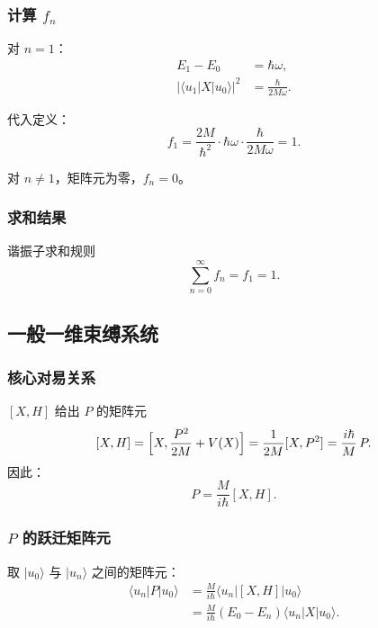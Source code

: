 \subsubsection{计算 $f_n$}

对 $n=1$：
\begin{align*}
  E_1 - E_0 &= \hbar\omega, \\
  \bigl|\langle u_1|X|u_0\rangle\bigr|^2 &= \frac{\hbar}{2M\omega}.
\end{align*}

代入定义：
\[
  f_1 = \frac{2M}{\hbar^2} \cdot \hbar\omega \cdot \frac{\hbar}{2M\omega} = \boxed{1}.
\]

对 $n\neq 1$，矩阵元为零，$f_n = 0$。

\subsubsection{求和结果}

\begin{formulabox}{谐振子求和规则}
\[
  \sum_{n=0}^{\infty} f_n = f_1 = \boxed{1}.
\]
\end{formulabox}


\subsection{一般一维束缚系统}

\subsubsection{核心对易关系}

\begin{tipbox}{$[X,H]$ 给出 $P$ 的矩阵元}
\[
  [X,H] = \Bigl[X, \frac{P^2}{2M} + V(X)\Bigr]
       = \frac{1}{2M}[X,P^2]
       = \frac{i\hbar}{M}\,P.
\]
因此：
\[
  \boxed{P = \frac{M}{i\hbar}[X,H]}.
\]
\end{tipbox}

\subsubsection{$P$ 的跃迁矩阵元}

取 $|u_0\rangle$ 与 $|u_n\rangle$ 之间的矩阵元：
\begin{align*}
  \langle u_n|P|u_0\rangle
  &= \frac{M}{i\hbar}\langle u_n|[X,H]|u_0\rangle \\
  &= \frac{M}{i\hbar}(E_0 - E_n)\langle u_n|X|u_0\rangle. \tag{1}
\end{align*}

